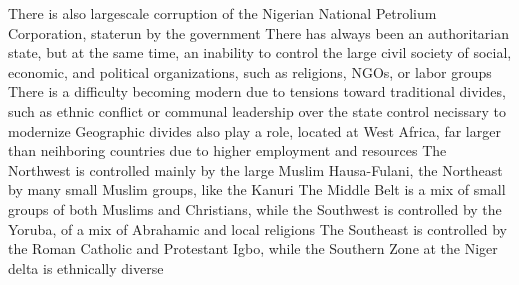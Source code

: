 \documentclass[11 pt, twoside]{article}
\newenvironment{outline*}
{
	\begin{outline}[enumerate]
	}
	{\end{outline}
}
\begin{document}
\begin{outline*}
\3 There is also largescale corruption of the Nigerian National Petrolium Corporation, staterun by the government
\2 There has always been an authoritarian state, but at the same time, an inability to control the large civil society of social, economic, and political organizations, such as religions, NGOs, or labor groups
\2 There is a difficulty becoming modern due to tensions toward traditional divides, such as ethnic conflict or communal leadership over the state control necissary to modernize
\2 Geographic divides also play a role, located at West Africa, far larger than neihboring countries due to higher employment and resources
\3 The Northwest is controlled mainly by the large Muslim Hausa-Fulani, the Northeast by many small Muslim groups, like the Kanuri
\3 The Middle Belt is a mix of small groups of both Muslims and Christians, while the Southwest is controlled by the Yoruba, of a mix of Abrahamic and local religions
\3 The Southeast is controlled by the Roman Catholic and Protestant Igbo, while the Southern Zone at the Niger delta is ethnically diverse
\end{outline*}
\end{document}
